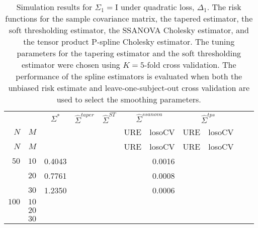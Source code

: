 \documentclass[12pt]{article}
\newcommand{\ra}[1]{\renewcommand{\arraystretch}{#1}}
\theoremstyle{definition}
\begin{document}
\begin{table}\centering
\ra{1.3}
\caption{Simulation results for $\Sigma_1 = \mathrm{I}$ under quadratic loss, $\Delta_1$. The risk functions for the sample covariance matrix, the tapered estimator, the soft thresholding estimator, the SSANOVA Cholesky estimator, and the tensor product P-spline Cholesky estimator. The tuning parameters for the tapering estimator and the soft thresholding estimator were chosen using $K = 5$-fold cross validation. The performance of the spline estimators is evaluated when both the unbiased risk estimate and leave-one-subject-out cross validation are used to select the smoothing parameters.}
\begin{tabular}{@{}rrrcrcrrcrr@{}}\toprule
   &            & \multicolumn{1}{c}{$\Sigma^*$}  & \multicolumn{1}{c}{$\hat{\Sigma}^{taper}$} &\multicolumn{1}{c}{$\hat{\Sigma}^{ST}$} &\multicolumn{2}{c}{ $\hat{\Sigma}^{ssanova}$} &  \multicolumn{2}{c}{ $\hat{\Sigma}^{tps}$}\\
$N$ & $M$ 	&	  &	& & \multicolumn{1}{c}{\mbox{URE}} & \multicolumn{1}{c}{\mbox{losoCV}} &\multicolumn{1}{c}{\mbox{URE}} & \multicolumn{1}{c}{\mbox{losoCV}}\\ \midrule
$N$ & $M$ 	&	  &	& & \multicolumn{1}{c}{\mbox{URE}} & \multicolumn{1}{c}{\mbox{losoCV}} &\multicolumn{1}{c}{\mbox{URE}} & \multicolumn{1}{c}{\mbox{losoCV}}\\ \midrule
$50$ & $10$ &	0.4043   &&&&   0.0016	&&\\
  & $20$  &    0.7761	&&&&   0.0008	&&\\
  & $30$   &    1.2350	&&&&   0.0006  &&\\ \midrule
$100$ & $10$ &&&&&&&\\
& $20$  &&&&&&& \\
& $30$  &&&&&&& \\
\bottomrule
\end{tabular}
\end{table}
\end{document}

